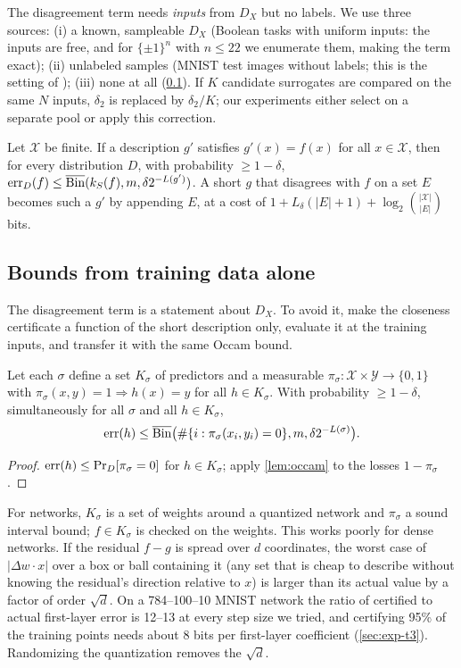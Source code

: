 The disagreement term needs \emph{inputs} from $D_X$ but no labels. We use three sources: (i) a known, sampleable $D_X$ (Boolean tasks with uniform inputs: the inputs are free, and for $\{\pm1\}^n$ with $n\le22$ we enumerate them, making the term exact); (ii) unlabeled samples (MNIST test images without labels; this is the setting of \citet{bazinet2026bound}); (iii) none at all (\cref{sec:transfer}). If $K$ candidate surrogates are compared on the same $N$ inputs, $\delta_2$ is replaced by $\delta_2/K$; our experiments either select on a separate pool or apply this correction.

\begin{corollary}\label{cor:anyD}
Let $\mathcal X$ be finite. If a description $g'$ satisfies $g'(x)=f(x)$ for all $x\in\mathcal X$, then for every distribution $D$, with probability $\ge1-\delta$, $\mathrm{err}_D(f)\le\overline{\mathrm{Bin}}(k_S(f),m,\delta2^{-L(g')})$. A short $g$ that disagrees with $f$ on a set $E$ becomes such a $g'$ by appending $E$, at a cost of $1+L_\delta(|E|+1)+\log_2\binom{|\mathcal X|}{|E|}$ bits.
\end{corollary}

\subsection{Bounds from training data alone}\label{sec:transfer}

The disagreement term is a statement about $D_X$. To avoid it, make the closeness certificate a function of the short description only, evaluate it at the training inputs, and transfer it with the same Occam bound.

\begin{theorem}\label{thm:certified}
Let each $\sigma$ define a set $K_\sigma$ of predictors and a measurable $\pi_\sigma:\mathcal X\times\mathcal Y\to\{0,1\}$ with $\pi_\sigma(x,y)=1\Rightarrow h(x)=y$ for all $h\in K_\sigma$. With probability $\ge1-\delta$, simultaneously for all $\sigma$ and all $h\in K_\sigma$,
\[
\mathrm{err}(h)\le\overline{\mathrm{Bin}}\big(\#\{i:\pi_\sigma(x_i,y_i)=0\},m,\delta2^{-L(\sigma)}\big).
\]
\end{theorem}
\begin{proof}
$\mathrm{err}(h)\le\Pr_D[\pi_\sigma=0]$ for $h\in K_\sigma$; apply \cref{lem:occam} to the losses $1-\pi_\sigma$.
\end{proof}

For networks, $K_\sigma$ is a set of weights around a quantized network and $\pi_\sigma$ a sound interval bound; $f\in K_\sigma$ is checked on the weights. This works poorly for dense networks. If the residual $f-g$ is spread over $d$ coordinates, the worst case of $|\Delta w\cdot x|$ over a box or ball containing it (any set that is cheap to describe without knowing the residual's direction relative to $x$) is larger than its actual value by a factor of order $\sqrt d$. On a 784--100--10 MNIST network the ratio of certified to actual first-layer error is 12--13 at every step size we tried, and certifying 95\% of the training points needs about 8 bits per first-layer coefficient (\cref{sec:exp-t3}). Randomizing the quantization removes the $\sqrt d$.

